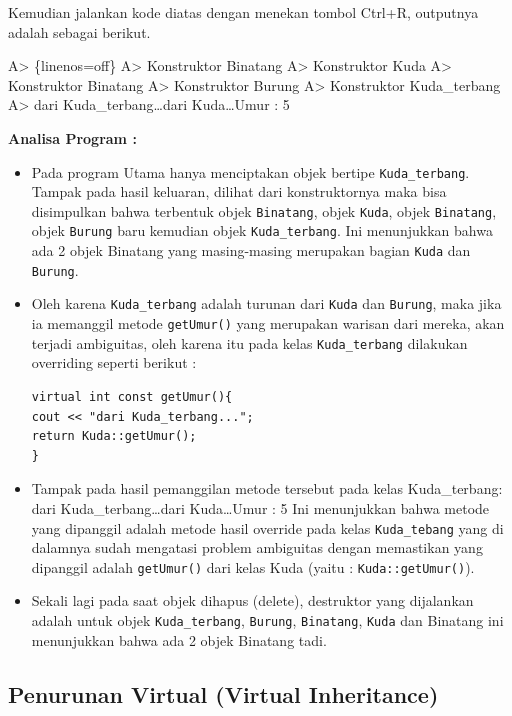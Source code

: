 Kemudian jalankan kode diatas dengan menekan tombol Ctrl+R, outputnya
adalah sebagai berikut.

A\textgreater{} \{linenos=off\} A\textgreater{} Konstruktor Binatang
A\textgreater{} Konstruktor Kuda A\textgreater{} Konstruktor Binatang
A\textgreater{} Konstruktor Burung A\textgreater{} Konstruktor
Kuda\_terbang A\textgreater{} dari Kuda\_terbang\ldots{}dari
Kuda\ldots{}Umur : 5

\textbf{Analisa Program :}

\begin{itemize}
\item
  Pada program Utama hanya menciptakan objek bertipe
  \texttt{Kuda\_terbang}. Tampak pada hasil keluaran, dilihat dari
  konstruktornya maka bisa disimpulkan bahwa terbentuk objek
  \texttt{Binatang}, objek \texttt{Kuda}, objek \texttt{Binatang}, objek
  \texttt{Burung} baru kemudian objek \texttt{Kuda\_terbang}. Ini
  menunjukkan bahwa ada 2 objek Binatang yang masing-masing merupakan
  bagian \texttt{Kuda} dan \texttt{Burung}.
\item
  Oleh karena \texttt{Kuda\_terbang} adalah turunan dari \texttt{Kuda}
  dan \texttt{Burung}, maka jika ia memanggil metode \texttt{getUmur()}
  yang merupakan warisan dari mereka, akan terjadi ambiguitas, oleh
  karena itu pada kelas \texttt{Kuda\_terbang} dilakukan overriding
  seperti berikut :

\begin{verbatim}
virtual int const getUmur(){
cout << "dari Kuda_terbang...";
return Kuda::getUmur();
}
\end{verbatim}
\item
  Tampak pada hasil pemanggilan metode tersebut pada kelas
  Kuda\_terbang: dari Kuda\_terbang\ldots{}dari Kuda\ldots{}Umur : 5 Ini
  menunjukkan bahwa metode yang dipanggil adalah metode hasil override
  pada kelas \texttt{Kuda\_tebang} yang di dalamnya sudah mengatasi
  problem ambiguitas dengan memastikan yang dipanggil adalah
  \texttt{getUmur()} dari kelas Kuda (yaitu : \texttt{Kuda::getUmur()}).
\item
  Sekali lagi pada saat objek dihapus (delete), destruktor yang
  dijalankan adalah untuk objek \texttt{Kuda\_terbang}, \texttt{Burung},
  \texttt{Binatang}, \texttt{Kuda} dan Binatang ini menunjukkan bahwa
  ada 2 objek Binatang tadi.
\end{itemize}

\subsection{Penurunan Virtual (Virtual
Inheritance)}\label{penurunan-virtual-virtual-inheritance}

